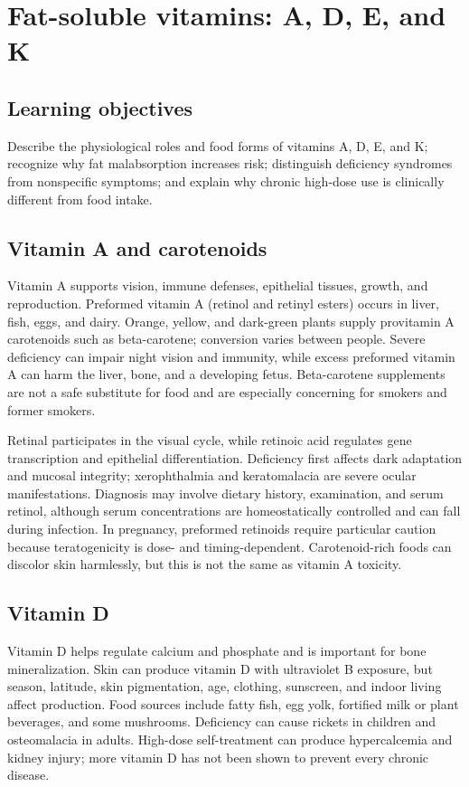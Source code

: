 \chapter{Fat-soluble vitamins: A, D, E, and K}

\section{Learning objectives}
Describe the physiological roles and food forms of vitamins A, D, E, and K; recognize why fat malabsorption increases risk; distinguish deficiency syndromes from nonspecific symptoms; and explain why chronic high-dose use is clinically different from food intake.

\section{Vitamin A and carotenoids}
Vitamin A supports vision, immune defenses, epithelial tissues, growth, and reproduction. Preformed vitamin A (retinol and retinyl esters) occurs in liver, fish, eggs, and dairy. Orange, yellow, and dark-green plants supply provitamin A carotenoids such as beta-carotene; conversion varies between people. Severe deficiency can impair night vision and immunity, while excess preformed vitamin A can harm the liver, bone, and a developing fetus. Beta-carotene supplements are not a safe substitute for food and are especially concerning for smokers and former smokers. \cite{odsA}

Retinal participates in the visual cycle, while retinoic acid regulates gene transcription and epithelial differentiation. Deficiency first affects dark adaptation and mucosal integrity; xerophthalmia and keratomalacia are severe ocular manifestations. Diagnosis may involve dietary history, examination, and serum retinol, although serum concentrations are homeostatically controlled and can fall during infection. In pregnancy, preformed retinoids require particular caution because teratogenicity is dose- and timing-dependent. Carotenoid-rich foods can discolor skin harmlessly, but this is not the same as vitamin A toxicity.

\section{Vitamin D}
Vitamin D helps regulate calcium and phosphate and is important for bone mineralization. Skin can produce vitamin D with ultraviolet B exposure, but season, latitude, skin pigmentation, age, clothing, sunscreen, and indoor living affect production. Food sources include fatty fish, egg yolk, fortified milk or plant beverages, and some mushrooms. Deficiency can cause rickets in children and osteomalacia in adults. High-dose self-treatment can produce hypercalcemia and kidney injury; more vitamin D has not been shown to prevent every chronic disease. \cite{odsD}


